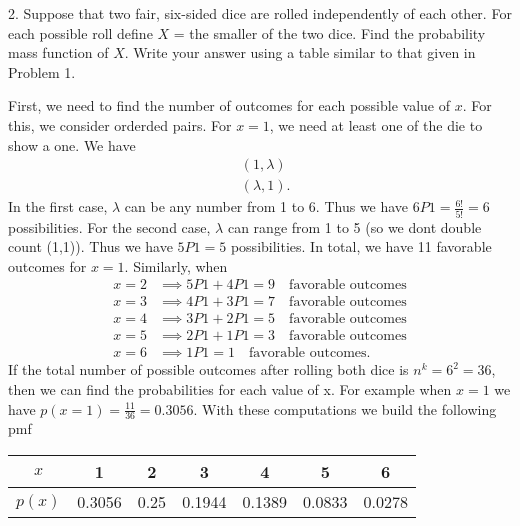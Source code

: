 \documentclass{report}
\begin{document}
 \pagebreak \bigbreak \noindent 
 \begin{mdframed}
     2. Suppose that two fair, six-sided dice are rolled independently of each other. For each possible roll define $X$ = the smaller of the two dice. Find the probability mass function of $X$. Write your answer using a table similar to that given in Problem 1.
 \end{mdframed}
 \bigbreak \noindent 
 First, we need to find the number of outcomes for each possible value of $x$. For this, we consider orderded pairs. For $x=1$, we need at least one of the die to show a one. We have
 \begin{align*}
     &(1, \lambda) \\ 
     &(\lambda, 1)
 .\end{align*}
 \bigbreak \noindent 
 In the first case, $\lambda$ can be any number from 1 to 6. Thus we have $6P1 = \frac{6!}{5!} = 6$ possibilities. For the second case, $\lambda$ can range from 1 to 5 (so we dont double count (1,1)). Thus we have $5P1 = 5$ possibilities. In total, we have 11 favorable outcomes for $x=1$. Similarly, when
 \bigbreak \noindent 
 \begin{align*}
     x=2 &\implies 5P1 + 4P1 = 9 \quad \text{favorable outcomes}\\
     x=3 &\implies 4P1 + 3P1 = 7 \quad \text{favorable outcomes}\\
     x=4 &\implies 3P1 + 2P1 = 5 \quad \text{favorable outcomes}\\
     x=5 &\implies 2P1 + 1P1 = 3 \quad \text{favorable outcomes}\\
     x=6 &\implies 1P1 = 1 \quad \text{favorable outcomes}
 .\end{align*}
 \bigbreak \noindent 
 If the total number of possible outcomes after rolling both dice is $n^{k} = 6^{2} = 36$, then we can find the probabilities for each value of x. For example when $x=1$ we have $p(x=1) = \frac{11}{36} = 0.3056$. With these computations we build the following pmf
 \bigbreak \noindent 
 \begin{center}
     \begin{tabular}{|c|c|c|c|c|c|c|}
         \hline 
         $x$ & 1 & 2 & 3 & 4 & 5 & 6\\ 
         \hline
         $p(x)$ & 0.3056 & 0.25 & 0.1944 & 0.1389 & 0.0833 & 0.0278 \\
         \hline
     \end{tabular}
 \end{center}
\end{document}
